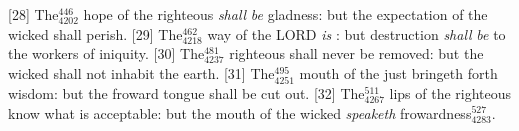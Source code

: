 [28] \textcolor[cmyk]{0.99998,1,0,0}{The\textcolor{jungle}{$_{4202}^{446}$} hope of the righteous \emph{shall} \emph{be} gladness: but the expectation of the wicked shall perish.}
[29] \textcolor[cmyk]{0.99998,1,0,0}{The\textcolor{jungle}{$_{4218}^{462}$} way of the LORD \emph{is} : but destruction \emph{shall} \emph{be} to the workers of iniquity.}
[30] \textcolor[cmyk]{0.99998,1,0,0}{The\textcolor{jungle}{$_{4237}^{481}$} righteous shall never be removed: but the wicked shall not inhabit the earth.}
[31] \textcolor[cmyk]{0.99998,1,0,0}{The\textcolor{jungle}{$_{4251}^{495}$} mouth of the just bringeth forth wisdom: but the froward tongue shall be cut out.}
[32] \textcolor[cmyk]{0.99998,1,0,0}{The\textcolor{jungle}{$_{4267}^{511}$} lips of the righteous know what is acceptable: but the mouth of the wicked \emph{speaketh} frowardness\textcolor{jungle}{$_{4283}^{527}$}.}

